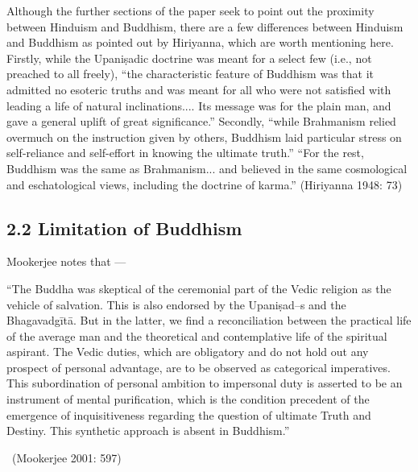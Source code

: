 Although the further sections of the paper seek to point out the proximity between Hinduism and Buddhism, there are a few differences between Hinduism and Buddhism as pointed out by Hiriyanna, which are worth mentioning here. Firstly, while the Upaniṣadic doctrine was meant for a select few (i.e., not preached to all freely), “the characteristic feature of Buddhism was that it admitted no esoteric truths and was meant for all who were not satisfied with leading a life of natural inclinations.... Its message was for the plain man, and gave a general uplift of great significance.” Secondly, “while Brahmanism relied overmuch on the instruction given by others, Buddhism laid particular stress on self-reliance and self-effort in knowing the ultimate truth.” “For the rest, Buddhism was the same as Brahmanism... and believed in the same cosmological and eschatological views, including the doctrine of karma.” (Hiriyanna 1948: 73)

\newpage

\subsection*{2.2 Limitation of Buddhism}

Mookerjee notes that —

\begin{myquote}
“The Buddha was skeptical of the ceremonial part of the Vedic religion as the vehicle of salvation. This is also endorsed by the Upaniṣad--s and the Bhagavadgītā. But in the latter, we find a reconciliation between the practical life of the average man and the theoretical and contemplative life of the spiritual aspirant. The Vedic duties, which are obligatory and do not hold out any prospect of personal advantage, are to be observed as categorical imperatives. This subordination of personal ambition to impersonal duty is asserted to be an instrument of mental purification, which is the condition precedent of the emergence of inquisitiveness regarding the question of ultimate Truth and Destiny. This synthetic approach is absent in Buddhism.” 

~\hfill (Mookerjee 2001: 597)
\end{myquote}

